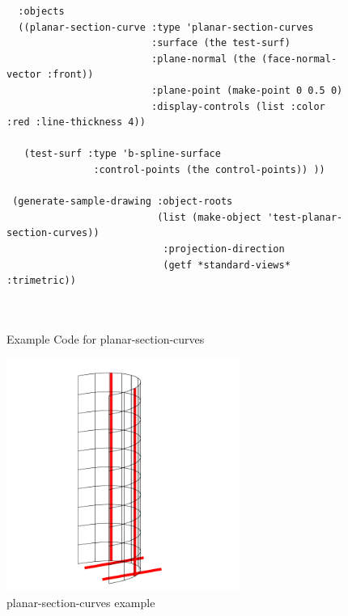 \documentclass [11pt]{book}
\begin{document}
\begin{itemize}
\begin{figure}
\begin{lrbox}{\boxedverb}
\begin{minipage}{\linewidth}
{\begin{verbatim}
  :objects
  ((planar-section-curve :type 'planar-section-curves
                         :surface (the test-surf)
                         :plane-normal (the (face-normal-vector :front))
                         :plane-point (make-point 0 0.5 0)
                         :display-controls (list :color :red :line-thickness 4))
   
   (test-surf :type 'b-spline-surface 
               :control-points (the control-points)) ))

 (generate-sample-drawing :object-roots 
                          (list (make-object 'test-planar-section-curves))
                           :projection-direction 
                           (getf *standard-views* :trimetric))

 
\end{verbatim}}
\end{minipage}
\end{lrbox}
\fbox{\usebox{\boxedverb}}

\caption{Example Code for planar-section-curves}

\label{fig:example-code-planar-section-curves}

\end{figure}

\begin{figure}
\begin{center}
\includegraphics[width=3in,height=3in]{../images/example-planar-section-curves.pdf}
\end{center}

\caption{planar-section-curves example}

\label{fig:planar-section-curves}

\end{figure}






\end{itemize}
\end{document}
